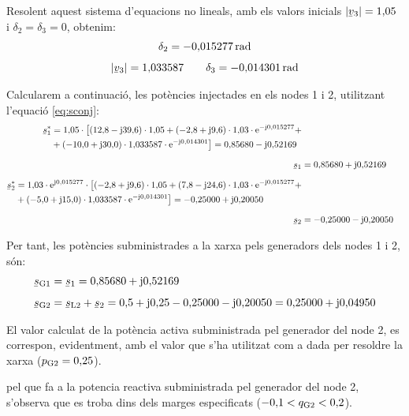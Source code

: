 \begin{exemple}
Resolent aquest sistema d'equacions no lineals, amb els valors
inicials $|\cmplx{v}_3|=1{,}05$ i $\delta_2=\delta_3=0$, obtenim:
\begin{gather*}
   \delta_2=-0{,}015277\unit{rad} \\[1ex]
   |\cmplx{v}_3|=1{,}033587 \qquad \delta_3=-0{,}014301\unit{rad}
\end{gather*}

Calcularem a continuaci\'{o}, les pot\`{e}ncies injectades en els nodes 1 i
2, utilitzant l'equaci\'{o} \eqref{eq:sconj}:
\begin{align*}
\begin{split}
\cmplx{s}_1^* &= 1{,}05 \cdot\bigl[ (12{,}8-\ju39{,}6) \cdot 1{,}05
+
(-2{,}8+\ju9{,}6) \cdot 1{,}03\cdot\eu^{-\ju0{,}015277} + \\
&+ (-10{,}0+\ju30{,}0) \cdot 1{,}033587\cdot\eu^{-\ju0{,}014301}
\bigr] = 0{,}85680 - \ju 0{,}52169
\end{split} \\[1.5ex]
\cmplx{s}_1 &= 0{,}85680 + \ju 0{,}52169 \\[1.5ex]
\begin{split}
\cmplx{s}_2^* &= 1{,}03 \cdot\eu^{\ju0{,}015277} \cdot\bigl[
(-2{,}8+\ju9{,}6) \cdot 1{,}05 +
 (7{,}8-\ju24{,}6) \cdot 1{,}03\cdot\eu^{-\ju0{,}015277} + \\
& + (-5{,}0+\ju15{,}0) \cdot 1{,}033587\cdot\eu^{-\ju0{,}014301}
\bigr] = -0{,}25000 + \ju 0{,}20050
\end{split} \\[1.5ex]
 \cmplx{s}_2 &= -0{,}25000 - \ju 0{,}20050
\end{align*}

Per tant, les pot\`{e}ncies subministrades a la xarxa pels generadors
dels nodes 1 i 2, s\'{o}n:
\begin{align*}
\cmplx{s}\ped{G1} &= \cmplx{s}_1 = 0{,}85680 + \ju 0{,}52169 \\[1ex]
\cmplx{s}\ped{G2} &= \cmplx{s}\ped{L2} + \cmplx{s}_2 = 0{,}5 + \ju
0{,}25 -0{,}25000 - \ju 0{,}20050  = 0{,}25000 + \ju 0{,}04950
\end{align*}

El valor calculat de la pot\`{e}ncia activa subministrada pel generador
del node 2, es
 correspon, evidentment, amb el valor que s'ha utilitzat com a dada per
resoldre la xarxa ($p_\mathrm{G2}=0{,}25$).

pel que fa a la potencia reactiva subministrada pel generador del
node 2, s'observa que es troba dins dels  marges especificats
($-0{,}1<q_\mathrm{G2}<0{,}2$).
\end{exemple}

